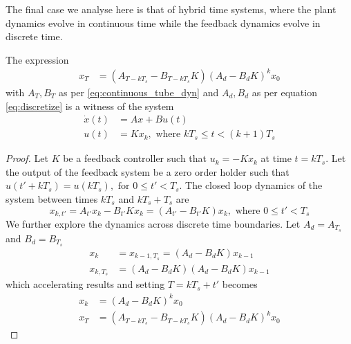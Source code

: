 \documentclass[sigconf]{llncs}
\newcommand{\mat}[1]{{#1}}
\renewcommand{\vec}[1]{{#1}}
\begin{document}
The final case we analyse here is that of hybrid time systems, where the
plant dynamics evolve in continuous time while the feedback dynamics evolve
in discrete time.

\begin{theorem}
The expression
 \begin{align}
 \vec{x}_{T} &= (\mat{A}_{T-kT_s}-\mat{B}_{T-kT_s}\mat{K}) (\mat{A}_d-\mat{B}_d\mat{K})^k\vec{x}_0
 \label{eq:cyber_feedback}
 \end{align}
 with $\mat{A}_T, \mat{B}_T$ as per \eqref{eq:continuous_tube_dyn} and $\mat{A}_d, \mat{B}_d$ as per equation \eqref{eq:discretize} is a witness of the system
 \begin{align}
 \dot{\vec{x}}({t}) &= \mat{A}\vec{x}+\mat{B}\vec{u}(t)\nonumber\\
 \vec{u}(t)&=\mat{K}\vec{x}_k, \text{ where }  kT_s \leq t < (k+1)T_s
 \end{align}
 \end{theorem}

\begin{proof}
Let $\mat{K}$ be a feedback controller such that $\vec{u}_k=-\mat{K}\vec{x}_k$ at time $t=kT_s$. Let the output of
the feedback system be a zero order holder such that $\vec{u}(t'+kT_s)=\vec{u}(kT_s), \text{ for }  0 \leq t' < T_s$.
The closed loop dynamics of the system between times $kT_s$ and $kT_s+T_s$ are
\begin{equation}
\vec{x}_{k,t'}=\mat{A}_{t'}\vec{x}_k-\mat{B}_{t'}\mat{K}\vec{x}_k = (\mat{A}_{t'}-\mat{B}_{t'}\mat{K})\vec{x}_k, \text{ where }  0 \leq t' < T_s
\end{equation}
We further explore the dynamics across discrete time boundaries. Let $\mat{A}_d=\mat{A}_{T_s}$ and $\mat{B}_d=\mat{B}_{T_s}$
\begin{align}
\vec{x}_{k}&=\vec{x}_{k-1,T_s}= (\mat{A}_d-\mat{B}_d\mat{K})\vec{x}_{k-1}\\
\vec{x}_{k,T_s} &= (\mat{A}_d-\mat{B}_d\mat{K}) (\mat{A}_d-\mat{B}_d\mat{K})\vec{x}_{k-1}
\end{align}
which accelerating results and setting $T=kT_s+t'$ becomes
\begin{align}
\label{eq:feedback_sampled_cont}
\vec{x}_{k} &= (\mat{A}_d-\mat{B}_d\mat{K}) ^k\vec{x}_0\\
\vec{x}_{T} &= (\mat{A}_{T-kT_s}-\mat{B}_{T-kT_s}\mat{K}) (\mat{A}_d-\mat{B}_d\mat{K})^k\vec{x}_0
\label{eq:feedback_cont}
\end{align}
\end{proof}
\end{document}
